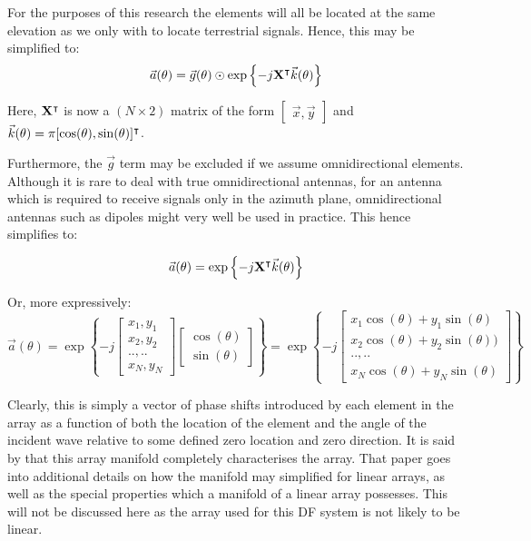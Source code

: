 For the purposes of this research the elements will all be located at the same elevation as we only with to locate terrestrial signals. Hence, this may be simplified to:
\begin{equation}
  \vec{a}(\theta) = \vec{g}(\theta) \odot \exp \left\{ -j \mathbf{X}^\intercal \vec{k}(\theta) \right\}
\end{equation}
    
Here, \(\mathbf{X}^\intercal\) is now a \((N \times 2)\) matrix of the form \(\begin{bmatrix} \vec{x}, \vec{y} \end{bmatrix}\) and \(\vec{k}(\theta) = \pi[\cos(\theta), \sin(\theta)]^\intercal\).

Furthermore, the \(\vec{g}\) term may be excluded if we assume omnidirectional elements. Although it is rare to deal with true omnidirectional antennas, for an antenna which is required to receive signals only in the azimuth plane, omnidirectional antennas such as dipoles might very well be used in practice. This hence simplifies to:

\begin{equation}
  \vec{a}(\theta) = \exp \left\{ -j \mathbf{X}^\intercal \vec{k}(\theta) \right\}
\end{equation}

Or, more expressively:
\begin{equation}
\vec{a}(\theta) = \exp \left\{ -j \begin{bmatrix} x_1, y_1 \\ x_2, y_2 \\ .., .. \\ x_N, y_N \end{bmatrix} \begin{bmatrix} \cos(\theta) \\ \sin(\theta) \end{bmatrix} \right\}
= \exp \left\{ -j \begin{bmatrix} x_1\cos(\theta) + y_1\sin(\theta) \\ x_2\cos(\theta) + y_2\sin(\theta)) \\ .., .. \\ x_N\cos(\theta) + y_N\sin(\theta) \end{bmatrix} \right\}
\end{equation}

Clearly, this is simply a vector of phase shifts introduced by each element in the array as a function of both the location of the element and the angle of the incident wave relative to some defined zero location and zero direction. It is said by \cite{dacos1995estimating} that this array manifold completely characterises the array. That paper goes into additional details on how the manifold may simplified for linear arrays, as well as the special properties which a manifold of a linear array possesses. This will not be discussed here as the array used for this DF system is not likely to be linear. 

